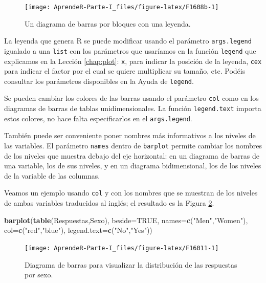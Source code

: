 \documentclass[]{book}
\newenvironment{Shaded}{\begin{snugshade}}{\end{snugshade}}
\newcommand{\DataTypeTok}[1]{\textcolor[rgb]{0.13,0.29,0.53}{#1}}
\newcommand{\KeywordTok}[1]{\textcolor[rgb]{0.13,0.29,0.53}{\textbf{#1}}}
\newcommand{\NormalTok}[1]{#1}
\newcommand{\OtherTok}[1]{\textcolor[rgb]{0.56,0.35,0.01}{#1}}
\newcommand{\StringTok}[1]{\textcolor[rgb]{0.31,0.60,0.02}{#1}}
\theoremstyle{definition}
\theoremstyle{definition}
\theoremstyle{definition}
\theoremstyle{remark}
\begin{document}
\begin{figure}

{\centering \texttt{[image: AprendeR-Parte-I\_files/figure-latex/F1608b-1]} 

}

\caption{Un diagrama de barras por bloques con una leyenda.}\label{fig:F1608b}
\end{figure}

La leyenda que genera R se puede modificar usando el parámetro \texttt{args.legend} igualado a una \texttt{list} con los parámetros que usaríamos en la función \texttt{legend} que explicamos en la Lección \ref{chap:plot}: \texttt{x}, para indicar la posición de la leyenda, \texttt{cex} para indicar el factor por el cual se quiere multiplicar su tamaño, etc.
Podéis consultar los parámetros disponibles en la Ayuda de \texttt{legend}.

Se pueden cambiar los colores de las barras usando el parámetro \texttt{col} como en los diagramas de barras de tablas unidimensionales. La función \texttt{legend.text} importa estos colores, no hace falta especificarlos en el \texttt{args.legend}.

También puede ser conveniente poner nombres más informativos a los niveles de las variables. El parámetro \texttt{names} dentro de \texttt{barplot} permite cambiar los nombres de los niveles que muestra debajo del eje horizontal: en un diagrama de barras de una variable, los de sus niveles, y en un diagrama bidimensional, los de los niveles de la variable de las columnas.

Veamos un ejemplo usando \texttt{col} y con los nombres que se muestran de los niveles de ambas variables traducidos al inglés; el resultado es la Figura \ref{fig:F16011}.

\begin{Shaded}
\begin{Highlighting}[]
\KeywordTok{barplot}\NormalTok{(}\KeywordTok{table}\NormalTok{(Respuestas,Sexo), }\DataTypeTok{beside=}\OtherTok{TRUE}\NormalTok{, }\DataTypeTok{names=}\KeywordTok{c}\NormalTok{(}\StringTok{"Men"}\NormalTok{,}\StringTok{"Women"}\NormalTok{),}
        \DataTypeTok{col=}\KeywordTok{c}\NormalTok{(}\StringTok{"red"}\NormalTok{,}\StringTok{"blue"}\NormalTok{), }\DataTypeTok{legend.text=}\KeywordTok{c}\NormalTok{(}\StringTok{"No"}\NormalTok{,}\StringTok{"Yes"}\NormalTok{))}
\end{Highlighting}
\end{Shaded}

\begin{figure}

{\centering \texttt{[image: AprendeR-Parte-I\_files/figure-latex/F16011-1]} 

}

\caption{Diagrama de barras para visualizar la distribución de las respuestas por sexo.}\label{fig:F16011}
\end{figure}
\end{document}
